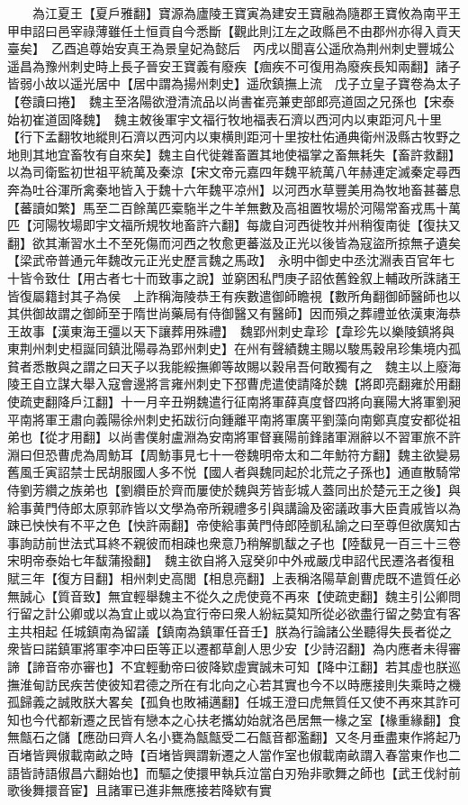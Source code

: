 　　為江夏王【夏戶雅翻】寶源為廬陵王寶寅為建安王寶融為隨郡王寶攸為南平王　甲申詔曰邑宰祿薄雖任土恒貢自今悉斷【觀此則江左之政縣邑不由郡州亦得入貢天臺矣】　乙酉追尊始安真王為景皇妃為懿后　丙戌以聞喜公遥欣為荆州刺史豐城公遥昌為豫州刺史時上長子晉安王寶義有廢疾【痼疾不可復用為廢疾長知兩翻】諸子皆弱小故以遥光居中【居中謂為揚州刺史】遥欣鎮撫上流　戊子立皇子寶卷為太子【卷讀曰捲】　魏主至洛陽欲澄清流品以尚書崔亮兼吏部郎亮道固之兄孫也【宋泰始初崔道固降魏】　魏主敇後軍宇文福行牧地福表石濟以西河内以東距河凡十里【行下孟翻牧地縱則石濟以西河内以東横則距河十里按杜佑通典衛州汲縣古牧野之地則其地宜畜牧有自來矣】魏主自代徙雜畜置其地使福掌之畜無耗失【畜許救翻】以為司衛監初世祖平統萬及秦涼【宋文帝元嘉四年魏平統萬八年赫連定滅秦定尋西奔為吐谷渾所禽秦地皆入于魏十六年魏平凉州】以河西水草豐美用為牧地畜甚蕃息【蕃讀如繁】馬至二百餘萬匹槖駞半之牛羊無數及高祖置牧場於河陽常畜戎馬十萬匹【河陽牧場即宇文福所規牧地畜許六翻】每歲自河西徙牧并州稍復南徙【復扶又翻】欲其漸習水土不至死傷而河西之牧愈更蕃滋及正光以後皆為寇盜所掠無孑遺矣【梁武帝普通元年魏改元正光史歷言魏之馬政】　永明中御史中丞沈淵表百官年七十皆令致仕【用古者七十而致事之說】並窮困私門庚子詔依舊銓叙上輔政所誅諸王皆復屬籍封其子為侯　上詐稱海陵恭王有疾數遣御師瞻視【數所角翻御師醫師也以其供御故謂之御師至于隋世尚藥局有侍御醫又有醫師】因而殞之葬禮並依漢東海恭王故事【漢東海王彊以天下讓葬用殊禮】　魏郢州刺史韋珍【韋珍先以樂陵鎮將與東荆州刺史桓誕同鎮沘陽尋為郢州刺史】在州有聲績魏主賜以駿馬穀帛珍集境内孤貧者悉散與之謂之曰天子以我能綏撫卿等故賜以穀帛吾何敢獨有之　魏主以上廢海陵王自立謀大舉入寇會邊將言雍州刺史下邳曹虎遣使請降於魏【將即亮翻雍於用翻使疏吏翻降戶江翻】十一月辛丑朔魏遣行征南將軍薛真度督四將向襄陽大將軍劉昶平南將軍王肅向義陽徐州刺史拓跋衍向鍾離平南將軍廣平劉藻向南鄭真度安都從祖弟也【從才用翻】以尚書僕射盧淵為安南將軍督襄陽前鋒諸軍淵辭以不習軍旅不許淵曰但恐曹虎為周魴耳【周魴事見七十一卷魏明帝太和二年魴符方翻】魏主欲變易舊風壬寅詔禁士民胡服國人多不悦【國人者與魏同起於北荒之子孫也】通直散騎常侍劉芳纘之族弟也【劉纘臣於齊而屢使於魏與芳皆彭城人蓋同出於楚元王之後】與給事黄門侍郎太原郭祚皆以文學為帝所親禮多引與講論及密議政事大臣貴戚皆以為踈已怏怏有不平之色【怏許兩翻】帝使給事黄門侍郎陸凱私諭之曰至尊但欲廣知古事詢訪前世法式耳終不親彼而相疎也衆意乃稍解凱馛之子也【陸馛見一百三十三卷宋明帝泰始七年馛蒲撥翻】　魏主欲自將入寇癸卯中外戒嚴戊申詔代民遷洛者復租賦三年【復方目翻】相州刺史高閭【相息亮翻】上表稱洛陽草創曹虎既不遣質任必無誠心【質音致】無宜輕舉魏主不從久之虎使竟不再來【使疏吏翻】魏主引公卿問行留之計公卿或以為宜止或以為宜行帝曰衆人紛紜莫知所從必欲盡行留之勢宜有客主共相起任城鎮南為留議【鎮南為鎮軍任音壬】朕為行論諸公坐聽得失長者從之衆皆曰諾鎮軍將軍李冲曰臣等正以遷都草創人思少安【少詩沼翻】為内應者未得審諦【諦音帝亦審也】不宜輕動帝曰彼降欵虛實誠未可知【降中江翻】若其虛也朕巡撫淮甸訪民疾苦使彼知君德之所在有北向之心若其實也今不以時應接則失乘時之機孤歸義之誠敗朕大畧矣【孤負也敗補邁翻】任城王澄曰虎無質任又使不再來其詐可知也今代都新遷之民皆有戀本之心扶老攜幼始就洛邑居無一椽之室【椽重緣翻】食無甔石之儲【應劭曰齊人名小甕為甔甔受二石甔音都濫翻】又冬月垂盡東作將起乃百堵皆興俶載南畝之時【百堵皆興謂新遷之人當作室也俶載南畝謂入春當東作也二語皆詩語俶昌六翻始也】而驅之使擐甲執兵泣當白刃殆非歌舞之師也【武王伐紂前歌後舞擐音宦】且諸軍已進非無應接若降欵有實
